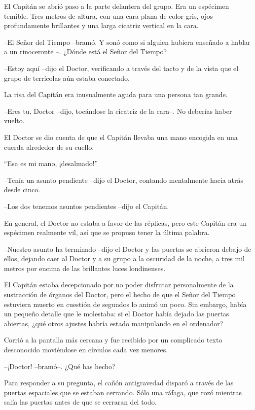 El Capitán se abrió paso a la parte delantera del grupo. Era un espécimen temible. Tres metros de altura, con una cara plana de color gris, ojos profundamente brillantes y una larga cicatriz vertical en la cara.

--El Señor del Tiempo --bramó. Y sonó como si alguien hubiera enseñado a hablar a un rinoceronte --. ¿Dónde está el Señor del Tiempo?

--Estoy aquí --dijo el Doctor, verificando a través del tacto y de la vista que el grupo de terrícolas aún estaba conectado.

La risa del Capitán era inusualmente aguda para una persona tan grande.

--Eres tu, Doctor --dijo, tocándose la cicatriz de la cara--. No deberías haber vuelto.

El Doctor se dio cuenta de que el Capitán llevaba una mano encogida en una cuerda alrededor de su cuello.

``Esa es mi mano, ¡desalmado!''

--Tenía un asunto pendiente --dijo el Doctor, contando mentalmente hacia atrás desde cinco.

--Los dos tenemos asuntos pendientes --dijo el Capitán.

En general, el Doctor no estaba a favor de las réplicas, pero este Capitán era un espécimen realmente vil, así que se propuso tener la última palabra.

--Nuestro asunto ha terminado --dijo el Doctor y las puertas se abrieron debajo de ellos, dejando caer al Doctor y a su grupo a la oscuridad de la noche, a tres mil metros por encima de las brillantes luces londinenses.

El Capitán estaba decepcionado por no poder disfrutar personalmente de la sustracción de órganos del Doctor, pero el hecho de que el Señor del Tiempo estuviera muerto en cuestión de segundos lo animó un poco. Sin embargo, había un pequeño detalle que le molestaba: si el Doctor  había dejado las puertas abiertas, ¿qué otros ajustes habría estado manipulando en el ordenador?

Corrió a la pantalla más cercana y fue recibido por un complicado texto desconocido moviéndose en círculos cada vez menores.

--¡Doctor! --bramó--. ¿Qué has hecho?

Para responder a su pregunta, el cañón antigravedad disparó a través de las puertas espaciales que se estaban cerrando. Sólo una ráfaga, que rozó mientras salía las puertas antes de que se cerraran del todo.


